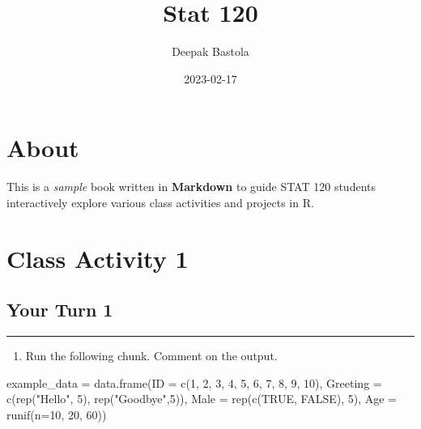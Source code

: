\documentclass[
]{book}
\title{Stat 120}
\author{Deepak Bastola}
\date{2023-02-17}
\newenvironment{Shaded}{\begin{snugshade}}{\end{snugshade}}
\newcommand{\AttributeTok}[1]{\textcolor[rgb]{0.77,0.63,0.00}{#1}}
\newcommand{\ConstantTok}[1]{\textcolor[rgb]{0.00,0.00,0.00}{#1}}
\newcommand{\DecValTok}[1]{\textcolor[rgb]{0.00,0.00,0.81}{#1}}
\newcommand{\FunctionTok}[1]{\textcolor[rgb]{0.00,0.00,0.00}{#1}}
\newcommand{\NormalTok}[1]{#1}
\newcommand{\OtherTok}[1]{\textcolor[rgb]{0.56,0.35,0.01}{#1}}
\newcommand{\StringTok}[1]{\textcolor[rgb]{0.31,0.60,0.02}{#1}}
\providecommand{\tightlist}{%
  \setlength{\itemsep}{0pt}\setlength{\parskip}{0pt}}
\begin{document}
\maketitle

{
\setcounter{tocdepth}{1}
\tableofcontents
}
\hypertarget{about}{%
\chapter*{About}\label{about}}

This is a \emph{sample} book written in \textbf{Markdown} to guide STAT 120 students interactively explore various class activities and projects in R.

\hypertarget{class-activity-1}{%
\chapter{Class Activity 1}\label{class-activity-1}}

\hypertarget{your-turn-1}{%
\section{Your Turn 1}\label{your-turn-1}}

\begin{center}\rule{0.5\linewidth}{0.5pt}\end{center}

\begin{enumerate}
\def\labelenumi{\alph{enumi}.}
\tightlist
\item
  Run the following chunk. Comment on the output.
\end{enumerate}

\begin{Shaded}
\begin{Highlighting}[]
\NormalTok{example\_data }\OtherTok{=} \FunctionTok{data.frame}\NormalTok{(}\AttributeTok{ID =} \FunctionTok{c}\NormalTok{(}\DecValTok{1}\NormalTok{, }\DecValTok{2}\NormalTok{, }\DecValTok{3}\NormalTok{, }\DecValTok{4}\NormalTok{, }\DecValTok{5}\NormalTok{, }\DecValTok{6}\NormalTok{, }\DecValTok{7}\NormalTok{, }\DecValTok{8}\NormalTok{, }\DecValTok{9}\NormalTok{, }\DecValTok{10}\NormalTok{),}
                          \AttributeTok{Greeting =} \FunctionTok{c}\NormalTok{(}\FunctionTok{rep}\NormalTok{(}\StringTok{"Hello"}\NormalTok{, }\DecValTok{5}\NormalTok{), }\FunctionTok{rep}\NormalTok{(}\StringTok{"Goodbye"}\NormalTok{,}\DecValTok{5}\NormalTok{)),}
                          \AttributeTok{Male =} \FunctionTok{rep}\NormalTok{(}\FunctionTok{c}\NormalTok{(}\ConstantTok{TRUE}\NormalTok{, }\ConstantTok{FALSE}\NormalTok{), }\DecValTok{5}\NormalTok{),}
                          \AttributeTok{Age =} \FunctionTok{runif}\NormalTok{(}\AttributeTok{n=}\DecValTok{10}\NormalTok{, }\DecValTok{20}\NormalTok{, }\DecValTok{60}\NormalTok{))}
\end{Highlighting}
\end{Shaded}
\end{document}
